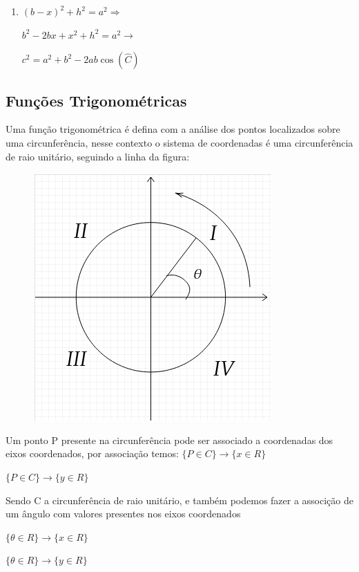 \begin{multicols*}{2}
\begin{enumerate}
        \item $(b - x)^2 + h^2 = a^2 \Rightarrow$

              $b^2 -2bx + x^2 + h^2 = a^2 \rightarrow$

              $ c^2 = a^2 + b^2 - 2ab \cos(\widehat{C}) $
    \end{enumerate}


    \subsection*{Funções Trigonométricas}

    Uma função trigonométrica é defina com a análise dos pontos localizados sobre uma circunferência, nesse contexto o sistema de coordenadas é uma circunferência de raio unitário, seguindo a linha da figura:

    \begin{figure}[H]
        \centering
        \includegraphics[scale=0.5]{assets/rafael/img31.png}
    \end{figure}

    Um ponto P presente na circunferência pode ser associado a coordenadas dos eixos coordenados, por associação temos:
    $\{ P \in C\} \rightarrow \{x \in R\}$

    $\{ P \in C\} \rightarrow \{y \in R\}$

    Sendo C a circunferência de raio unitário, e também podemos fazer a associção de um ângulo com valores presentes nos eixos coordenados

    $\{\theta \in R \} \rightarrow \{x \in R\}$

    $\{\theta \in R \} \rightarrow \{ y \in R\}$


\end{multicols*}
